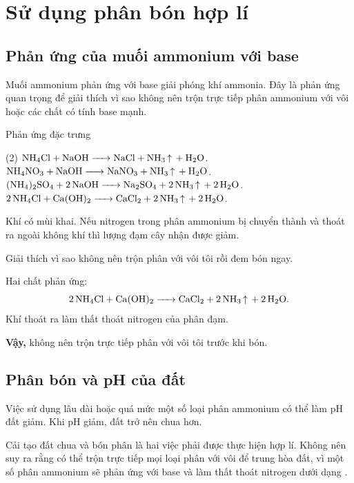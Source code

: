 \section{Sử dụng phân bón hợp lí}

\subsection{Phản ứng của muối ammonium với base}

Muối ammonium phản ứng với base giải phóng khí ammonia. Đây là phản ứng quan trọng để giải thích vì sao không nên trộn trực tiếp phân ammonium với vôi hoặc các chất có tính base mạnh.

\begin{ghinho}{Phản ứng đặc trưng}
\begin{tasks}(2)
\task $\ce{NH4Cl + NaOH -> NaCl + NH3 ^ + H2O}$.
\task $\ce{NH4NO3 + NaOH -> NaNO3 + NH3 ^ + H2O}$.
\task $\ce{(NH4)2SO4 + 2NaOH -> Na2SO4 + 2NH3 ^ + 2H2O}$.
\task $\ce{2NH4Cl + Ca(OH)2 -> CaCl2 + 2NH3 ^ + 2H2O}$.
\end{tasks}
\end{ghinho}

Khí  có mùi khai. Nếu nitrogen trong phân ammonium bị chuyển thành  và thoát ra ngoài không khí thì lượng đạm cây nhận được giảm.

\begin{vidu}
Giải thích vì sao không nên trộn phân  với vôi tôi  rồi đem bón ngay.
\end{vidu}
\begin{loigiai}
Hai chất phản ứng:
\[
\ce{2NH4Cl + Ca(OH)2 -> CaCl2 + 2NH3 ^ + 2H2O}.
\]
Khí  thoát ra làm thất thoát nitrogen của phân đạm.

\textbf{Vậy,} không nên trộn trực tiếp phân  với vôi tôi trước khi bón.
\end{loigiai}

\subsection{Phân bón và pH của đất}

Việc sử dụng lâu dài hoặc quá mức một số loại phân ammonium có thể làm pH đất giảm. Khi pH giảm, đất trở nên chua hơn.

\begin{notechem}
Cải tạo đất chua và bón phân là hai việc phải được thực hiện hợp lí. Không nên suy ra rằng có thể trộn trực tiếp mọi loại phân với vôi để trung hòa đất, vì một số phân ammonium sẽ phản ứng với base và làm thất thoát nitrogen dưới dạng .
\end{notechem}

